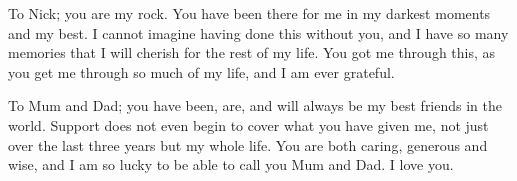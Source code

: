 To Nick;  you are my rock. You have been there for me in my darkest moments and my best.  I cannot imagine having done this without you, and I have so many memories that I will cherish for the rest of my life.  You got me through this, as you get me through so much of my life, and I am ever grateful.

To Mum and Dad;  you have been, are, and will always be my best friends in the world.  Support does not even begin to cover what you have given me, not just over the last three years but my whole life.  You are both caring, generous and wise, and I am so lucky to be able to call you Mum and Dad.  I love you.   



%
%

